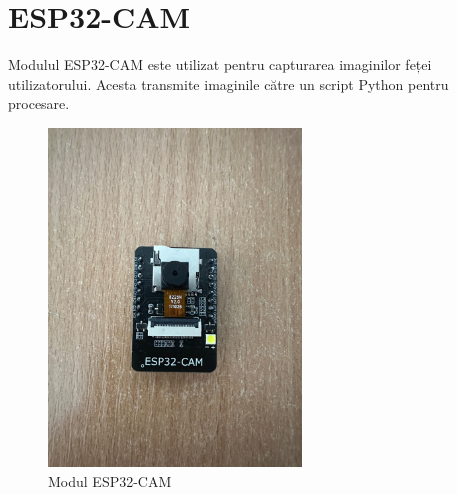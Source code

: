\documentclass{report}
\begin{document}
\section{ESP32-CAM}
Modulul ESP32-CAM este utilizat pentru capturarea imaginilor feței utilizatorului. Acesta transmite imaginile către un script Python pentru procesare.

\begin{figure}[H]
    \centering
    \includegraphics[width=0.6\textwidth]{esp32_cam.jpg}
    \caption{Modul ESP32-CAM}
    \label{fig:esp32_cam}
\end{figure}
\end{document}
